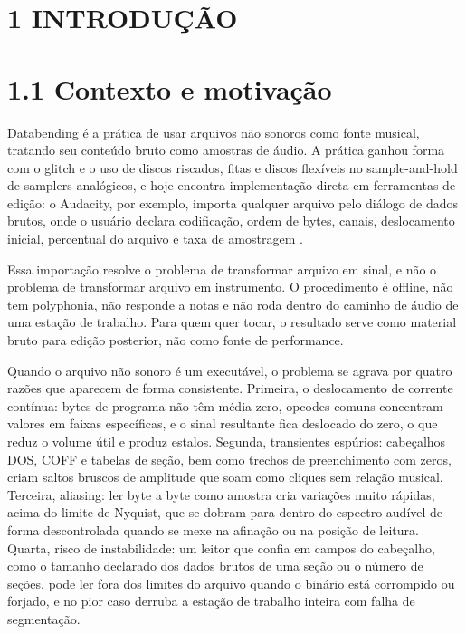 \documentclass[12pt,a4paper]{article}
\begin{document}
\bigskip



\section*{1 INTRODUÇÃO}

\section*{1.1 Contexto e motivação}

Databending é a prática de usar arquivos não sonoros como fonte musical, tratando seu conteúdo bruto como amostras de áudio. A prática ganhou forma com o glitch e o uso de discos riscados, fitas e discos flexíveis no sample-and-hold de samplers analógicos, e hoje encontra implementação direta em ferramentas de edição: o Audacity, por exemplo, importa qualquer arquivo pelo diálogo de dados brutos, onde o usuário declara codificação, ordem de bytes, canais, deslocamento inicial, percentual do arquivo e taxa de amostragem \cite{audacityraw}.


Essa importação resolve o problema de transformar arquivo em sinal, e não o problema de transformar arquivo em instrumento. O procedimento é offline, não tem polyphonia, não responde a notas e não roda dentro do caminho de áudio de uma estação de trabalho. Para quem quer tocar, o resultado serve como material bruto para edição posterior, não como fonte de performance.


Quando o arquivo não sonoro é um executável, o problema se agrava por quatro razões que aparecem de forma consistente. Primeira, o deslocamento de corrente contínua: bytes de programa não têm média zero, opcodes comuns concentram valores em faixas específicas, e o sinal resultante fica deslocado do zero, o que reduz o volume útil e produz estalos. Segunda, transientes espúrios: cabeçalhos DOS, COFF e tabelas de seção, bem como trechos de preenchimento com zeros, criam saltos bruscos de amplitude que soam como cliques sem relação musical. Terceira, aliasing: ler byte a byte como amostra cria variações muito rápidas, acima do limite de Nyquist, que se dobram para dentro do espectro audível de forma descontrolada quando se mexe na afinação ou na posição de leitura. Quarta, risco de instabilidade: um leitor que confia em campos do cabeçalho, como o tamanho declarado dos dados brutos de uma seção ou o número de seções, pode ler fora dos limites do arquivo quando o binário está corrompido ou forjado, e no pior caso derruba a estação de trabalho inteira com falha de segmentação.
\end{document}
